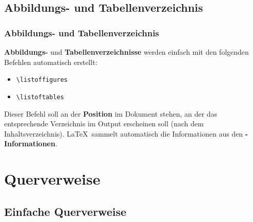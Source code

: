 \subsection{Abbildungs- und Tabellenverzeichnis}

\begin{frame}[fragile]
\frametitle{Abbildungs- und Tabellenverzeichnis}

\textbf{Abbildungs-} und \textbf{Tabellenverzeichnisse} werden einfach mit den folgenden Befehlen automatisch erstellt:

\begin{itemize}
	\item \lstinline|\listoffigures| 
	\item \lstinline|\listoftables| 
\end{itemize}

Dieser Befehl soll an der \textbf{Position} im Dokument stehen, an der das entsprechende Verzeichnis im Output erscheinen soll (\idR nach dem Inhaltsverzeichnis). \LaTeX\ sammelt automatisch die Informationen aus den \textbf{-Informationen}.  
\end{frame}


\section{Querverweise}
\label{sec:references}


\subsection{Einfache Querverweise}

